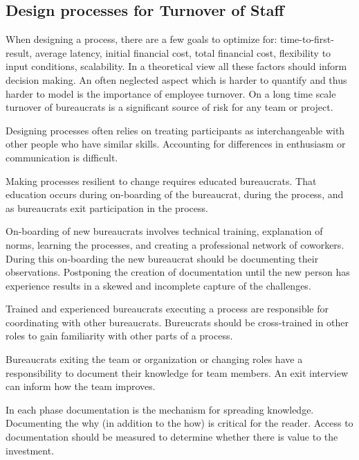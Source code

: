 \subsection{Design processes for Turnover of Staff\label{sec:turnover}}


When designing a process, there are a few goals to optimize for: time-to-first-result, average latency, initial financial cost, total financial cost, flexibility to input conditions, scalability. In a theoretical view all these factors should inform decision making. An often neglected aspect which is harder to quantify and thus harder to model is the importance of employee turnover. On a long time scale turnover of bureaucrats is a significant source of risk for any team or project. 

Designing processes often relies on treating participants as interchangeable with other people who have similar skills. Accounting for differences in enthusiasm or communication is difficult. 

Making processes resilient to change requires educated bureaucrats. That education occurs during on-boarding of the bureaucrat, during the process, and as bureaucrats exit participation in the process. 

On-boarding of new bureaucrats involves technical training, explanation of norms, learning the processes, and creating a professional network of coworkers. During this on-boarding the new bureaucrat should be documenting their observations. Postponing the creation of documentation until the new person has experience results in a skewed and incomplete capture of the challenges.

Trained and experienced bureaucrats executing a process are responsible for coordinating with other bureaucrats. Bureucrats should be cross-trained in other roles to gain familiarity with other parts of a process. 

Bureaucrats exiting the team or organization or changing roles have a responsibility to document their knowledge for team members. An exit interview can inform how the team improves. 

In each phase documentation is the mechanism for spreading knowledge. Documenting the why (in addition to the how) is critical for the reader. Access to documentation should be measured to determine whether there is value to the investment. 